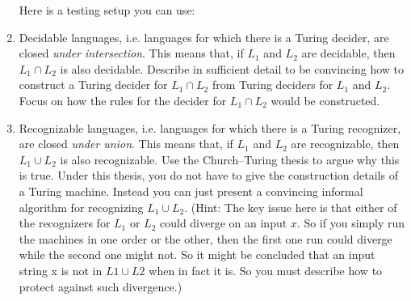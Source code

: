 \documentclass{cs81-homework}
\begin{document}
\begin{enumerate}
  Here is a testing setup you can use:
  

  \begin{solution}
  \end{solution}

\item {} Decidable languages, i.e. languages for which there is a
  Turing decider, are closed \emph{under intersection}.  This means that, if
  \(L_1\) and \(L_2\) are decidable, then \(L_1 \cap L_2\) is also decidable.
  Describe in sufficient detail to be convincing how to construct a Turing
  decider for \(L_1 \cap L_2\) from Turing deciders for \(L_1\) and \(L_2\).
  Focus on how the rules for the decider for \(L_1 \cap L_2\) would be
  constructed.

  \begin{solution}
  \end{solution}

\item {} Recognizable languages, i.e. languages for which there is a
  Turing recognizer, are closed \emph{under union}. This means that, if \(L_1\)
  and \(L_2\) are recognizable, then \(L_1 \cup L_2\) is also recognizable.  Use
  the Church--Turing thesis to argue why this is true.  Under this thesis, you
  do not have to give the construction details of a Turing machine. Instead you
  can just present a convincing informal algorithm for recognizing
  \(L_1 \cup L_2\).  (Hint: The key issue here is that either of the recognizers
  for \(L_1\) or \(L_2\) could diverge on an input \(x\).  So if you simply run
  the machines in one order or the other, then the first one run could diverge
  while the second one might not.  So it might be concluded that an input string
  x is not in \(L1 \cup L2\) when in fact it is.  So you must describe how to
  protect against such divergence.)

  \begin{solution}
  \end{solution}
\end{enumerate}

  
\end{document}
